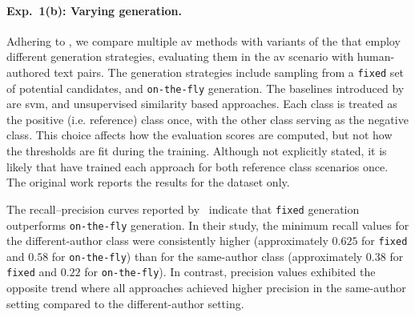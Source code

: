 %     
%     


\paragraph{Exp.\ 1(b): Varying \imp{} generation.}

Adhering to \citet{koppel_determining_2014}, we compare multiple \ac{av} methods with variants of the \impAppr{} that employ different \imp{} generation strategies, evaluating them in the \ac{av} scenario with human-authored text pairs.
The \imp{} generation strategies include sampling from a \texttt{fixed} set of potential \imp{} candidates, and \texttt{on-the-fly} \imp{} generation. 
The baselines introduced by \citet{koppel_determining_2014} are \ac{svm}, and unsupervised similarity based approaches.
Each class is treated as the positive (i.e. reference) class once, with the other class serving as the negative class. 
This choice affects how the evaluation scores are computed, but not how the thresholds are fit during the training.
Although not explicitly stated, it is likely that \citet{koppel_determining_2014} have trained each approach for both reference class scenarios once.
The original work reports the results for the \dataBlog{} dataset only.

The recall–precision curves reported by \citet{koppel_determining_2014}\ indicate that \texttt{fixed} \imp{} generation outperforms \texttt{on-the-fly} \imp{} generation.
In their study, the minimum recall values for the different-author class were consistently higher (approximately $0.625$ for \texttt{fixed} and $0.58$ for \texttt{on-the-fly}) than for the same-author class (approximately $0.38$ for \texttt{fixed} and $0.22$ for \texttt{on-the-fly}).
In contrast, precision values exhibited the opposite trend where all approaches achieved higher precision in the same-author setting compared to the different-author setting.


